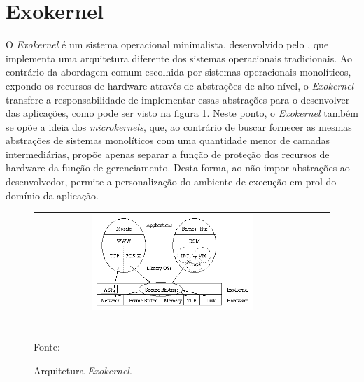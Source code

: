 \documentclass[
	12pt,				%
	openright,			%
	twoside,			%
	a4paper,			%
	english,			%
	brazil,				%
	]{abntex2}
\begin{document}
    \section{Exokernel}
    \label{sec:exokernel}
    
        O \textit{Exokernel} é um sistema operacional minimalista, desenvolvido pelo \unimit, que implementa uma arquitetura diferente dos sistemas operacionais tradicionais. 
        Ao contrário da abordagem comum escolhida por sistemas operacionais monolíticos, expondo os recursos de hardware através de abstrações de alto nível, o \textit{Exokernel} transfere a responsabilidade de implementar essas abstrações para o desenvolver das aplicações, como pode ser visto na figura \ref{figexokernel}.
        Neste ponto, o \textit{Exokernel} também se opõe a ideia dos \textit{microkernels}, que, ao contrário de buscar fornecer as mesmas abstrações de sistemas monolíticos com uma quantidade menor de camadas intermediárias, propõe apenas separar a função de proteção dos recursos de hardware da função de gerenciamento.
        Desta forma, ao não impor abstrações ao desenvolvedor, permite a personalização do ambiente de execução em prol do domínio da aplicação.
        
        \begin{figure}[t]
        	\begin{center}
            	\caption{Arquitetura \textit{Exokernel}.}
                   \label{figexokernel}
        		\begin{tabular}{ccc}
            	    \includegraphics[width=0.6\textwidth]{figs/exokernel.png} \\
        		\end{tabular}
                \vspace{1ex} \\
                Fonte: \cite{engler_exokernel:_1995}
            \end{center}
           \vspace{-2ex}
        \end{figure}
        
\end{document}
